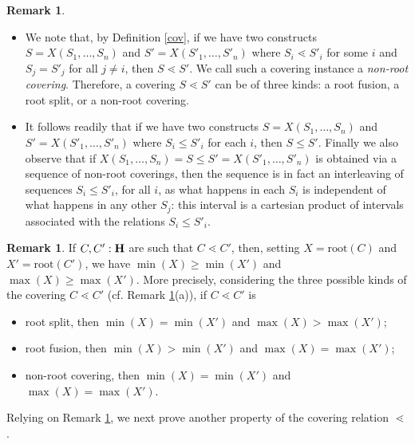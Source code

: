 \documentclass{article}
\theoremstyle{plain}
\theoremstyle{definition}
\newtheorem{remark}[thm]{Remark}
\begin{document}
\begin{remark} \label {lem:StabilityByContext}
\begin{itemize}
\item[a)] We note that, by Definition \ref{cov}, if we have two constructs $S=X(S_1,\ldots,S_n)$ and $S'=X(S'_1,\ldots,S'_n)$
where $S_i\lessdot S'_i$ for some $i$ and $S_j=S'_j$ for all $j\neq i$, then $S\lessdot S'$.
We call such a covering instance a {\em non-root covering}. Therefore, a covering $S\lessdot S'$ can be of three kinds: a root fusion, a root split, or a non-root covering. 
\item[b) ]It follows readily that if we have two constructs $S=X(S_1,\ldots,S_n)$ and $S'=X(S'_1,\ldots,S'_n)$
where $S_i\leq S'_i$ for each $i$, then $S\leq S'$. 
Finally we also observe that if $X(S_1,\ldots,S_n)=S\leq S'=X(S'_1,\ldots,S'_n)$ is obtained via a sequence of non-root coverings, then the sequence is in fact an interleaving of sequences $S_i\leq S'_i$, for all $i$, as what happens in each $S_i$ is independent of what happens in any other $S_j$: this interval is a cartesian product of intervals associated with the relations $S_i\leq S'_i$. 
\end{itemize}
\end{remark} 


\begin{remark}\label{l1}
If $C,C':{\bf H}$ are such that $C\lessdot C'$, then, setting $X=\textrm{root}(C)$ and
 $X'=\textrm{root}(C')$, we have $\min(X)\geq \min(X')$ and $\max(X)\geq\max(X')$. More precisely, considering the three possible kinds of the covering $C\lessdot C'$ (cf. Remark \ref{lem:StabilityByContext}(a)), if $C\lessdot C'$ is 
\begin{itemize}
\item[-] root split, then $\min(X)=\min(X')$ and $\max(X)>\max(X')$;
\item[-] root fusion, then $\min(X)>\min(X')$ and $\max(X)=\max(X')$; 
\item[-] non-root covering, then $\min(X)=\min(X')$ and $\max(X)=\max(X')$.
 \end{itemize}
\end{remark}

 

Relying on Remark \ref{l1}, we next prove another property of the covering relation $\lessdot$.
\end{document}
